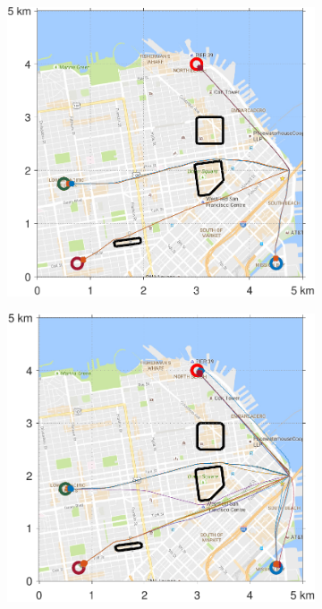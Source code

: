 \begin{figure}[!htb]
\begin{subfigure}{0.5\textwidth}
  \includegraphics[width=\columnwidth]{figs/sf_d6sep5}
  \label{fig:sf_d6sep5}
\end{subfigure}%
\begin{subfigure}{0.5\textwidth}
  \includegraphics[width=\columnwidth]{figs/sf_d11sep5}

\end{subfigure}
\end{figure}
